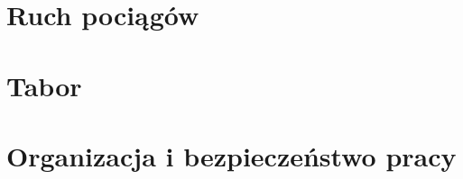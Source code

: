 \documentclass[10pt]{witten}
\begin{document}
	
	\frontmatter
	\onecolumn
	

	
	
	
	\twocolumn
	\pagestyle{fancy-pagenum}
	\maintoc

	
	
	\mainmatter

	\part{Ruch pociągów}
	
	
	\part{Tabor}
	
	
	\part{Organizacja i bezpieczeństwo pracy}
	
	
	\backmatter
	\clearpage
	\nocite{*}
	
\end{document}
